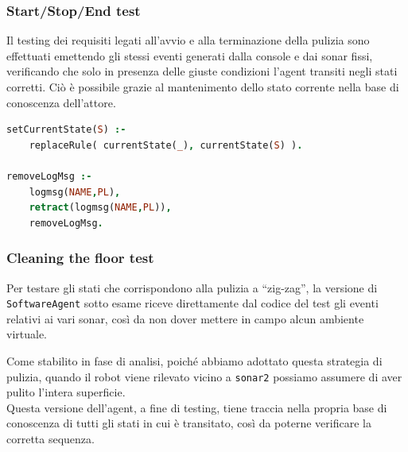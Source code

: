 \documentclass{../llncs}
\newcommand{\codescript}[1]{{\mbox{\small{\texttt{#1}}}}\xspace}
\newcommand{\code}[1]{{\color{blue}\small{\texttt{#1}}}}
\newcommand{\labelssec}[1]{\label{ssec:#1}}
\begin{document}
\subsubsection{Start/Stop/End test}
Il testing dei requisiti legati all'avvio e alla terminazione della pulizia sono effettuati emettendo gli stessi eventi generati dalla console e dai sonar fissi, verificando che solo in presenza delle giuste condizioni l'agent transiti negli stati corretti. Ciò è possibile grazie al mantenimento dello stato corrente nella base di conoscenza dell'attore.\\



\begin{lstlisting}[language=Prolog, keywordstyle=\color{black}, caption={swag1 Rules}]
setCurrentState(S) :-
	replaceRule( currentState(_), currentState(S) ).
	 		
removeLogMsg :-
	logmsg(NAME,PL),
	retract(logmsg(NAME,PL)),
	removeLogMsg.
\end{lstlisting}

\subsubsection{Cleaning the floor test}
\labelssec{cleaningTest}
Per testare gli stati che corrispondono alla pulizia a ``zig-zag'', la versione di \codescript{SoftwareAgent} sotto esame riceve direttamente dal codice del test gli eventi relativi ai vari sonar, così da non dover mettere in campo alcun ambiente virtuale.

Come stabilito in fase di analisi, poiché abbiamo adottato questa strategia di pulizia, quando il robot viene rilevato vicino a \code{sonar2} possiamo assumere di aver pulito l'intera superficie.\\



Questa versione dell'agent, a fine di testing, tiene traccia nella propria base di conoscenza di tutti gli stati in cui è transitato, così da poterne verificare la corretta sequenza.\\


\end{document}
